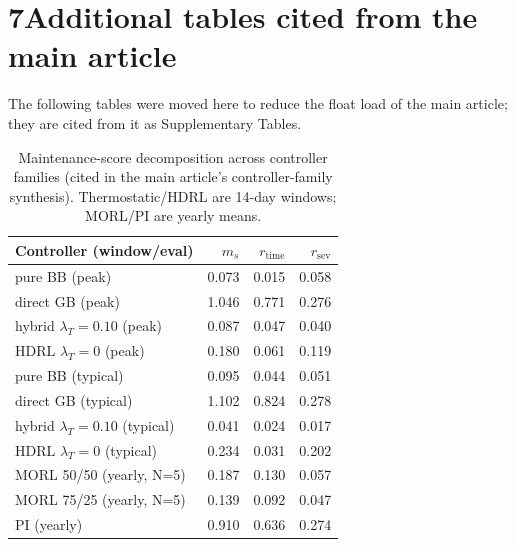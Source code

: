 \documentclass[11pt,a4paper]{article}
\begin{document}
\section*{7\quad Additional tables cited from the main article}
The following tables were moved here to reduce the float load of the main article; they are cited from it as Supplementary Tables.
\begin{table}[H]
\centering
\caption{Maintenance-score decomposition across controller families (cited in the main article's controller-family synthesis). Thermostatic/HDRL are 14-day windows; MORL/PI are yearly means.}
\label{tab:msdecomp}
\small
\begin{tabular}{lrrr}
\toprule
Controller (window/eval) & $m_s$ & $r_{\mathrm{time}}$ & $r_{\mathrm{sev}}$ \\
\midrule
pure BB (peak) & 0.073 & 0.015 & 0.058 \\
direct GB (peak) & 1.046 & 0.771 & 0.276 \\
hybrid $\lambda_T{=}0.10$ (peak) & 0.087 & 0.047 & 0.040 \\
HDRL $\lambda_T{=}0$ (peak) & 0.180 & 0.061 & 0.119 \\
pure BB (typical) & 0.095 & 0.044 & 0.051 \\
direct GB (typical) & 1.102 & 0.824 & 0.278 \\
hybrid $\lambda_T{=}0.10$ (typical) & 0.041 & 0.024 & 0.017 \\
HDRL $\lambda_T{=}0$ (typical) & 0.234 & 0.031 & 0.202 \\
MORL 50/50 (yearly, N=5) & 0.187 & 0.130 & 0.057 \\
MORL 75/25 (yearly, N=5) & 0.139 & 0.092 & 0.047 \\
PI (yearly) & 0.910 & 0.636 & 0.274 \\
\bottomrule
\end{tabular}
\end{table}
\end{document}
